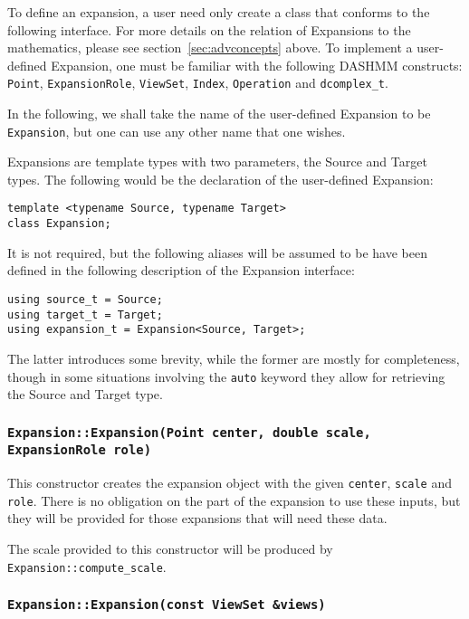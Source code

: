 To define an expansion, a user need only create a class that conforms to the
following interface. For more details on the relation of Expansions to the
mathematics, please see section~\ref{sec:advconcepts} above. To implement a
user-defined Expansion, one must be familiar with the following DASHMM
constructs: \texttt{Point}, \texttt{ExpansionRole}, \texttt{ViewSet},
\texttt{Index}, \texttt{Operation} and \texttt{dcomplex\_t}.

In the following, we shall take the name of the user-defined Expansion to
be \texttt{Expansion}, but one can use any other name that one wishes.

Expansions are template types with two parameters, the Source and Target
types. The following would be the declaration of the user-defined Expansion:

\begin{verbatim}
template <typename Source, typename Target>
class Expansion;
\end{verbatim}

\noindent It is not required, but the following aliases will be assumed to be
have been defined in the following description of the Expansion interface:

\begin{verbatim}
using source_t = Source;
using target_t = Target;
using expansion_t = Expansion<Source, Target>;
\end{verbatim}

\noindent The latter introduces some brevity, while the former are mostly
for completeness, though in some situations involving the \texttt{auto} keyword
they allow for retrieving the Source and Target type.

\subsubsection{\texttt{Expansion::Expansion(Point center, double scale, ExpansionRole role)}}

This constructor creates the expansion object with the given \texttt{center},
\texttt{scale} and \texttt{role}. There is no obligation on the part of the
expansion to use these inputs, but they will be provided for those expansions
that will need these data.

The scale provided to this constructor will be produced by
\texttt{Expansion::compute\_scale}.

\subsubsection{\texttt{Expansion::Expansion(const ViewSet \&views)}}

